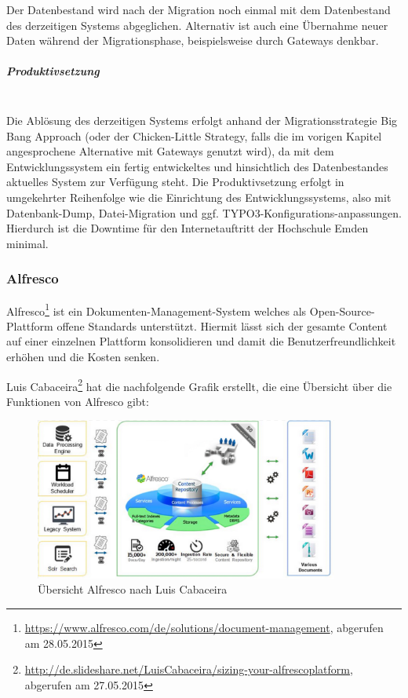 Der Datenbestand wird nach der Migration noch einmal mit dem Datenbestand des derzeitigen Systems abgeglichen. Alternativ ist auch eine Übernahme neuer Daten während der Migrationsphase, beispielsweise durch Gateways denkbar. 

\subparagraph{Produktivsetzung}\mbox{}\\
Die Ablösung des derzeitigen Systems erfolgt anhand der Migrationsstrategie Big Bang Approach (oder der Chicken-Little Strategy, falls die im vorigen Kapitel angesprochene Alternative mit Gateways genutzt wird), da mit dem Entwicklungssystem ein fertig entwickeltes und hinsichtlich des Datenbestandes aktuelles System zur Verfügung steht. Die Produktivsetzung erfolgt in umgekehrter Reihenfolge wie die Einrichtung des Entwicklungssystems, also mit Datenbank-Dump, Datei-Migration und ggf. TYPO3-Konfigurations-anpassungen. Hierdurch ist die Downtime für den Internetauftritt der Hochschule Emden minimal.

\subsubsection{Alfresco}
\label{subsubsection_migration_alfresco}
Alfresco\footnote{\url{https://www.alfresco.com/de/solutions/document-management}, abgerufen am 28.05.2015} ist ein Dokumenten-Management-System welches als Open-Source-Plattform offene Standards unterstützt. Hiermit lässt sich der gesamte Content auf einer einzelnen Plattform konsolidieren und damit die Benutzerfreundlichkeit erhöhen und die Kosten senken.

Luis Cabaceira\footnote{\url{http://de.slideshare.net/LuisCabaceira/sizing-your-alfrescoplatform}, abgerufen am 27.05.2015} hat die nachfolgende Grafik erstellt, die eine Übersicht über die Funktionen von Alfresco gibt:

\begin{figure}[h!]
	\centering
	\includegraphics[width=10cm]{kapitel/gruppe4_1/bilder/uebersicht_alfresco}
	\caption{Übersicht Alfresco nach Luis Cabaceira}
	\label{fig_uebersicht_alfresco}
\end{figure}

